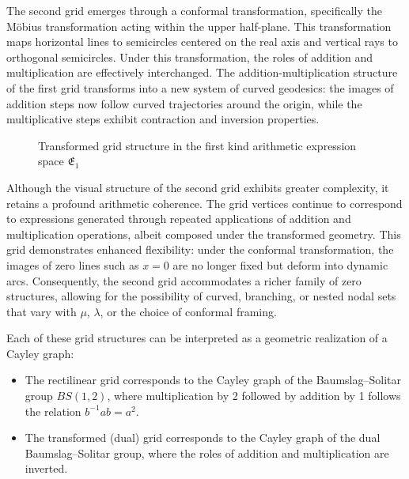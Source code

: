 The second grid emerges through a conformal transformation, specifically the Möbius transformation acting within the upper half-plane. This transformation maps horizontal lines to semicircles centered on the real axis and vertical rays to orthogonal semicircles. Under this transformation, the roles of addition and multiplication are effectively interchanged. The addition-multiplication structure of the first grid transforms into a new system of curved geodesics: the images of addition steps now follow curved trajectories around the origin, while the multiplicative steps exhibit contraction and inversion properties.

\begin{figure}[ht]
\centering
{}
\caption{Transformed grid structure in the first kind arithmetic expression space $\mathfrak{E}_1$}\label{fig:grid2}
\end{figure}

Although the visual structure of the second grid exhibits greater complexity, it retains a profound arithmetic coherence. The grid vertices continue to correspond to expressions generated through repeated applications of addition and multiplication operations, albeit composed under the transformed geometry. This grid demonstrates enhanced flexibility: under the conformal transformation, the images of zero lines such as $x=0$ are no longer fixed but deform into dynamic arcs. Consequently, the second grid accommodates a richer family of zero structures, allowing for the possibility of curved, branching, or nested nodal sets that vary with $\mu$, $\lambda$, or the choice of conformal framing.

Each of these grid structures can be interpreted as a geometric realization of a Cayley graph:

\begin{itemize}
\item The rectilinear grid corresponds to the Cayley graph of the Baumslag–Solitar group $BS(1,2)$, where multiplication by 2 followed by addition by 1 follows the relation $b^{-1}ab = a^2$.
\item The transformed (dual) grid corresponds to the Cayley graph of the dual Baumslag–Solitar group, where the roles of addition and multiplication are inverted.
\end{itemize}


